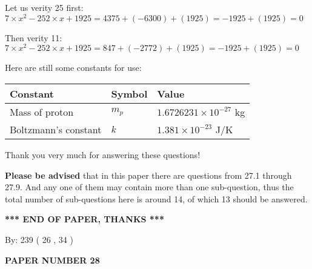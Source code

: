 \documentclass[12pt]{article}
\begin{document}
Let us verity  %
25 first:
$  %
7 \times x^2  %
-252
                 \times x    %
+  %
1925
  = %
4375+( %
-6300)+( %
1925)
  = %
-1925+( %
1925)
  = %
0
$
 
Then verity  %
11:
$  %
7 \times x^2  %
-252
                 \times x    %
+  %
1925
  = %
847+( %
-2772)+( %
1925)
  = %
-1925+( %
1925)
  = %
0
$
 
 
 
   
   
 \vspace{0.2in}
Here are still some constants for use:
 
 
\noindent\begin{tabular}{|l|l|l|}
\hline
Constant & Symbol & Value \\
\hline
 
Mass of proton &
$m_p$ &
 $ 1.6726231 \times 10^{-27} $
kg \\
\hline
 
Boltzmann's constant &
$k$ &
 $ 1.381 \times 10^{-23} $
J/K \\
\hline
 
\end{tabular}
 
Thank you very much for answering these questions!
 
{\textbf{\large{Please be advised}}} that in this paper there are questions from
27.1 through
27.9.
And any one of them may contain more than one sub-question, thus the total number
of sub-questions here is around 14, of which
13 should be answered.
 
   
   
   
   
\vspace{1.0in} 
{\textbf{\large{ *** END OF PAPER, THANKS *** }}} 
   
   
\hspace{1.0in} By: 
         239 (          26 ,           34 )
   
   
   
   
\newpage 
\setcounter{page}{ 
    28001 } 
   
   
   
   
 {\textbf{ \Large{ PAPER NUMBER           28  }}}
   
   
\vspace{0.2in}
   
   
   
\end{document}
